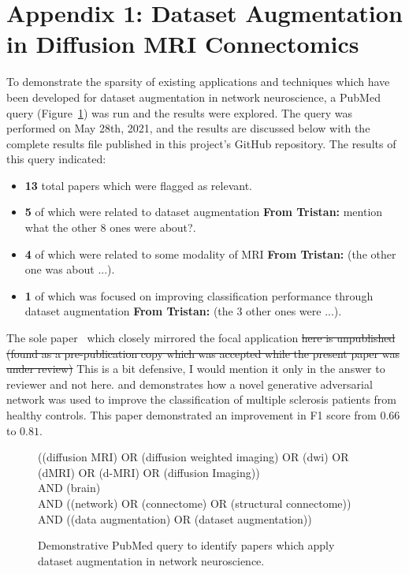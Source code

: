 \documentclass[10pt]{SelfArx} %
\newcommand{\tristan}[1]{\colorlet{saved}{.}\color{orange}\textbf{From Tristan:} #1\color{saved}\xspace}
\newcommand{\tristanmod}[2]{\colorlet{saved}{.}\color{orange}\sout{#1} #2\color{black}\xspace\color{saved}}
\newcommand{\new}[1]{\color{blue}#1\color{black}\xspace}
\begin{document}
\clearpage
\onecolumn
\new{
\section*{Appendix 1: Dataset Augmentation in Diffusion MRI Connectomics}
\label{app:augmentation}

To demonstrate the sparsity of existing applications and techniques which have been developed for dataset augmentation
in network neuroscience, a PubMed query (Figure~\ref{pubmedquery}) was run and the results were explored. The query was
performed on May 28th, 2021, and the results are discussed below with the complete results file published in this
project's GitHub repository. The results of this query indicated:

\begin{itemize}
\item \textbf{13} total papers which were flagged as relevant.
\item \textbf{5} of which were related to dataset augmentation \tristan{mention what the other 8 ones were about?}.
\item \textbf{4} of which were related to some modality of MRI \tristan{(the other one was about ...)}.
\item \textbf{1} of which was focused on improving classification performance through dataset augmentation \tristan{(the 3 other ones were ...)}.
\end{itemize}

The sole paper~\cite{barile2021data} which closely mirrored the focal application \tristanmod{here is unpublished (found as a
pre-publication copy which was accepted while the present paper was under review)}{This is a bit defensive, I would mention it only
 in the answer to reviewer and not here.} 
and demonstrates how a novel
generative adversarial network was used to improve the classification of multiple sclerosis patients from healthy
controls. This paper demonstrated an improvement in F1 score from $0.66$ to $0.81$.

\begin{figure}[h!]
\begin{tcolorbox}\centering
((diffusion MRI) OR (diffusion weighted imaging) OR (dwi) OR (dMRI) OR (d-MRI) OR (diffusion Imaging))\\
AND (brain)\\
AND ((network) OR (connectome) OR (structural connectome))\\
AND ((data augmentation) OR (dataset augmentation))
\end{tcolorbox}
\caption{Demonstrative PubMed query to identify papers which apply dataset augmentation in network neuroscience.}
\label{pubmedquery}
\end{figure}
}
\end{document}

